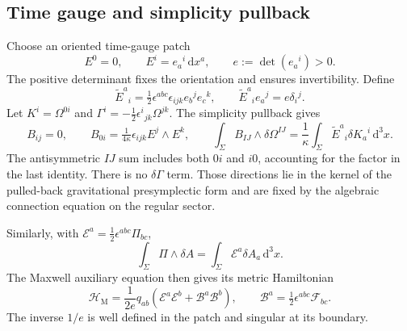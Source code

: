 \subsection{Time gauge and simplicity pullback}
Choose an oriented time-gauge patch
\begin{equation}
 E^0=0,\qquad E^i=e_a{}^i\,\mathrm dx^a,
 \qquad e:=\det(e_a{}^i)>0.
 \label{c:constraints:regular-triad}
\end{equation}
The positive determinant fixes the orientation and ensures invertibility. Define
\begin{equation}
 \widetilde E^a{}_i=\tfrac12\epsilon^{abc}\epsilon_{ijk}e_b{}^je_c{}^k,
 \qquad \widetilde E^a{}_ie_a{}^j=e\delta_i{}^j.
\end{equation}
Let $K^i=\Omega^{0i}$ and
$\Gamma^i=-\tfrac12\epsilon^i{}_{jk}\Omega^{jk}$.
The simplicity pullback gives
\begin{equation}
 B_{ij}=0,\qquad
 B_{0i}=\tfrac1{4\kappa}\epsilon_{ijk}E^j\wedge E^k,
 \qquad
 \int_\Sigma B_{IJ}\wedge\delta\Omega^{IJ}
      =\frac1\kappa\int_\Sigma\widetilde E^a{}_i\delta K_a{}^i\,\mathrm d^3x.
 \label{c:constraints:simplicity}
\end{equation}
The antisymmetric $IJ$ sum includes both $0i$ and $i0$, accounting for the factor in the last identity. There is no $\delta\Gamma$ term. Those directions lie in the kernel of the pulled-back gravitational presymplectic form and are fixed by the algebraic connection equation on the regular sector.

Similarly, with $\mathcal E^a=\tfrac12\epsilon^{abc}\Pi_{bc}$,
\begin{equation}
 \int_\Sigma\Pi\wedge\delta A
        =\int_\Sigma\mathcal E^a\delta A_a\,\mathrm d^3x.
\end{equation}
The Maxwell auxiliary equation then gives its metric Hamiltonian
\begin{equation}
 \mathcal H_{\mathrm M}=\frac1{2e}q_{ab}
       (\mathcal E^a\mathcal E^b+\mathcal B^a\mathcal B^b),
 \qquad \mathcal B^a=\tfrac12\epsilon^{abc}\mathcal F_{bc}.
\end{equation}
The inverse $1/e$ is well defined in the patch and singular at its boundary.

